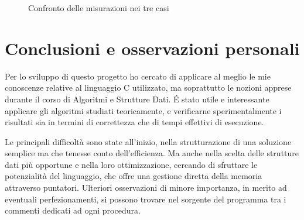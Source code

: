 \documentclass[a4paper,8pt]{article}
\theoremstyle{definition}
\theoremstyle{remark}
\begin{document}
\begin{figure}[H]
  \centering
  \caption{Confronto delle misurazioni nei tre casi}
\label{fig:confronto}
\end{figure}

\section{Conclusioni e osservazioni personali}
Per lo sviluppo di questo progetto ho cercato di applicare al meglio le mie conoscenze
relative al linguaggio C utilizzato, ma soprattutto le nozioni apprese durante il
corso di Algoritmi e Strutture Dati. \'E stato utile e interessante applicare gli
algoritmi studiati teoricamente, e verificarne sperimentalmente i risultati sia in
termini di correttezza che di tempi effettivi di esecuzione.

Le principali difficoltà sono state all'inizio, nella strutturazione di una soluzione
semplice ma che tenesse conto dell'efficienza. Ma anche nella scelta delle strutture
dati più opportune e nella loro ottimizzazione, cercando di sfruttare le potenzialità
del linguaggio, che offre una gestione diretta della memoria attraverso puntatori.
Ulteriori osservazioni di minore importanza, in merito ad eventuali perfezionamenti,
si possono trovare nel sorgente del programma tra i commenti dedicati ad ogni procedura.
\end{document}
